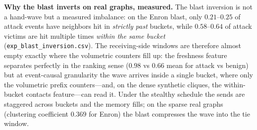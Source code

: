 \smallskip\noindent\textbf{Why the blast inverts on real graphs, measured.}
The blast inversion is not a hand-wave but a measured imbalance: on the Enron blast, only
$0.21$--$0.25$ of attack events have neighbors hit in \emph{strictly past} buckets, while
$0.58$--$0.64$ of attack victims are hit multiple times \emph{within the same bucket}
(\texttt{exp\_blast\_inversion.csv}). The receiving-side windows are therefore almost empty exactly
where the volumetric counters fill up: the freshness feature separates perfectly in the ranking sense
($0.98$ vs $0.66$ mean for attack vs benign) but at event-causal granularity the wave arrives inside a
single bucket, where only the volumetric prefix counters---and, on the dense synthetic cliques, the
within-bucket contacts feature---can read it. Under the stealthy schedule the sends are staggered
across buckets and the memory fills; on the sparse real graphs (clustering coefficient $0.369$ for
Enron) the blast compresses the wave into the tie window.

